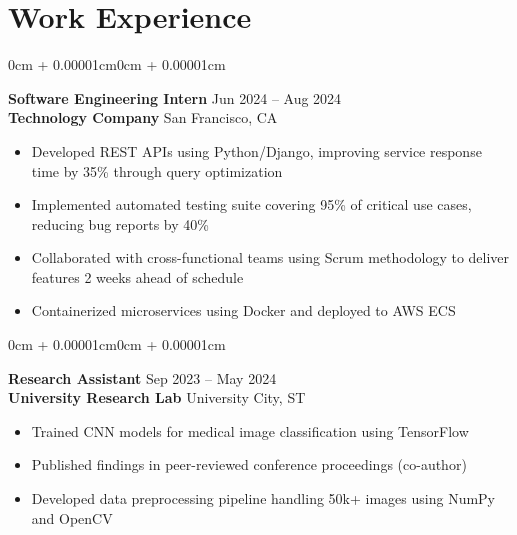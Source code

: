 \documentclass[10pt, letterpaper]{article}
\newenvironment{highlights}{
    \begin{itemize}[
        topsep=0.10 cm,
        parsep=0.10 cm,
        partopsep=0pt,
        itemsep=0pt,
        leftmargin=0 cm + 10pt
    ]
}{\end{itemize}}
\newenvironment{onecolentry}{
    \begin{adjustwidth}{0cm + 0.00001cm}{0cm + 0.00001cm}
}{\end{adjustwidth}}
\begin{document}
    \vspace{-8pt}
    \section{Work Experience}
    \vspace{-12pt}
    \hrulefill
    \begin{onecolentry}
    {\normalsize \textbf{Software Engineering Intern}} \hfill {Jun 2024 – Aug 2024}\\
    {\textbf{Technology Company}} \hfill {San Francisco, CA}\\
    \begin{highlights}
        \item Developed REST APIs using Python/Django, improving service response time by 35\% through query optimization
        \item Implemented automated testing suite covering 95\% of critical use cases, reducing bug reports by 40\%
        \item Collaborated with cross-functional teams using Scrum methodology to deliver features 2 weeks ahead of schedule
        \item Containerized microservices using Docker and deployed to AWS ECS
    \end{highlights}
    \end{onecolentry}
    
    \begin{onecolentry}
    {\normalsize \textbf{Research Assistant}} \hfill {Sep 2023 – May 2024}\\
    {\textbf{University Research Lab}} \hfill {University City, ST}\\
    \begin{highlights}
        \item Trained CNN models for medical image classification using TensorFlow
        \item Published findings in peer-reviewed conference proceedings (co-author)
        \item Developed data preprocessing pipeline handling 50k+ images using NumPy and OpenCV
    \end{highlights}
    \end{onecolentry}
    
    \vspace{-8pt}
\end{document}

